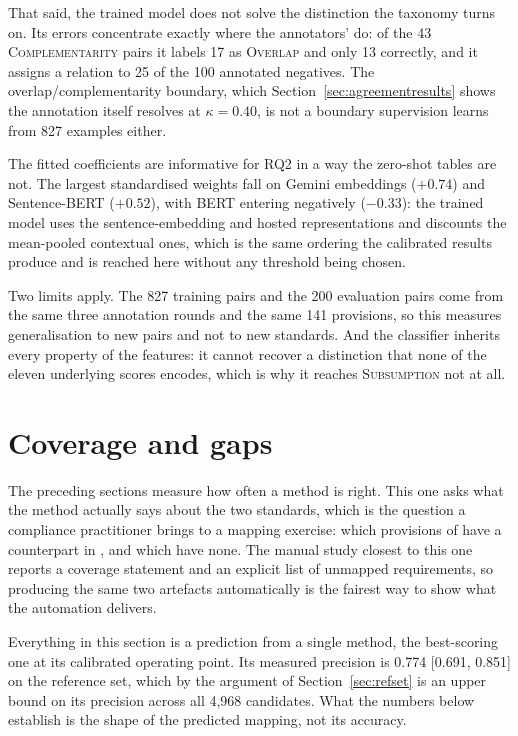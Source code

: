 That said, the trained model does not solve the distinction the taxonomy turns on.
Its errors concentrate exactly where the annotators' do: of the 43
\textsc{Complementarity} pairs it labels 17 as \textsc{Overlap} and only 13
correctly, and it assigns a relation to 25 of the 100 annotated negatives. The
overlap/complementarity boundary, which Section~\ref{sec:agreementresults} shows
the annotation itself resolves at $\kappa = 0.40$, is not a boundary supervision
learns from 827 examples either.

The fitted coefficients are informative for RQ2 in a way the zero-shot tables are
not. The largest standardised weights fall on Gemini embeddings ($+0.74$) and
Sentence-BERT ($+0.52$), with BERT entering negatively ($-0.33$): the trained
model uses the sentence-embedding and hosted representations and discounts the
mean-pooled contextual ones, which is the same ordering the calibrated results
produce and is reached here without any threshold being chosen.

Two limits apply. The 827 training pairs and the 200 evaluation pairs come from
the same three annotation rounds and the same 141 provisions, so this measures
generalisation to new pairs and not to new standards. And the classifier inherits
every property of the features: it cannot recover a distinction that none of the
eleven underlying scores encodes, which is why it reaches
\textsc{Subsumption} not at all.

\section{Coverage and gaps}\label{sec:coverage}

The preceding sections measure how often a method is right. This one asks what
the method actually says about the two standards, which is the question a
compliance practitioner brings to a mapping exercise: which provisions of
\standardA{} have a counterpart in \standardB{}, and which have none. The manual
study closest to this one~\cite{djebbar2023comparative} reports a coverage
statement and an explicit list of unmapped requirements, so producing the same
two artefacts automatically is the fairest way to show what the automation
delivers.

Everything in this section is a prediction from a single method, the best-scoring
one at its calibrated operating point. Its measured precision is 0.774
[0.691, 0.851] on the reference set, which by the argument of
Section~\ref{sec:refset} is an upper bound on its precision across all 4{,}968
candidates. What the numbers below establish is the shape of the predicted
mapping, not its accuracy.


